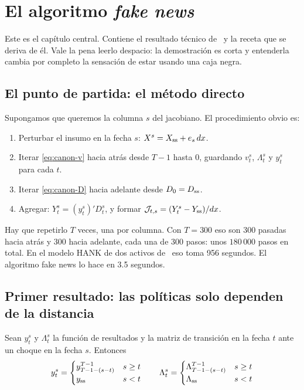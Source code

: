 \chapter{El algoritmo \emph{fake news}}
\label{cap:fakenews}

Este es el capítulo central. Contiene el resultado técnico de \ABRS\ y la receta
que se deriva de él. Vale la pena leerlo despacio: la demostración es corta y
entenderla cambia por completo la sensación de estar usando una caja negra.

\section{El punto de partida: el método directo}

Supongamos que queremos la columna $s$ del jacobiano. El procedimiento obvio es:

\begin{enumerate}[leftmargin=1.4em,itemsep=1pt]
\item Perturbar el insumo en la fecha $s$: $X^s = X_{\mathrm{ss}} + e_s\, dx$.
\item Iterar \eqref{eq:canon-v} hacia atrás desde $T-1$ hasta $0$, guardando
$v^s_t$, $\Lambda^s_t$ y $y^s_t$ para cada $t$.
\item Iterar \eqref{eq:canon-D} hacia adelante desde $D_0 = D_{\mathrm{ss}}$.
\item Agregar: $Y^s_t = (y^s_t)' D^s_t$, y formar $\mathcal{J}_{t,s} = (Y^s_t - Y_{\mathrm{ss}})/dx$.
\end{enumerate}

Hay que repetirlo $T$ veces, una por columna. Con $T=300$ eso son $300$ pasadas
hacia atrás y $300$ hacia adelante, cada una de $300$ pasos: unos $180\,000$
pasos en total. En el modelo HANK de dos activos de \abrs\ eso toma 956 segundos.
El algoritmo fake news lo hace en 3.5 segundos.

\section{Primer resultado: las políticas solo dependen de la distancia}

\begin{lema}
\label{lema:politicas}
Sean $y^s_t$ y $\Lambda^s_t$ la función de resultados y la matriz de transición
en la fecha $t$ ante un choque en la fecha $s$. Entonces
\begin{equation}
y^s_t = \begin{cases} y^{T-1}_{T-1-(s-t)} & s\ge t\\ y_{\mathrm{ss}} & s<t\end{cases}
\qquad
\Lambda^s_t = \begin{cases} \Lambda^{T-1}_{T-1-(s-t)} & s\ge t\\ \Lambda_{\mathrm{ss}} & s<t\end{cases}
\label{eq:lema1}
\end{equation}
\end{lema}

